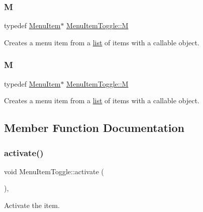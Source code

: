 \subsubsection{\texorpdfstring{M}{M}\hspace{0.1cm}{\footnotesize\ttfamily [1/2]}}
{\footnotesize\ttfamily typedef \hyperlink{classMenuItem}{Menu\+Item}$\ast$ \hyperlink{classMenuItemToggle_a4f44d80e256ed59e1994b4a04f009903}{Menu\+Item\+Toggle\+::M}}

Creates a menu item from a \hyperlink{protocollist-p}{list} of items with a callable object. \mbox{\label{classMenuItemToggle_a4f44d80e256ed59e1994b4a04f009903}} 
\subsubsection{\texorpdfstring{M}{M}\hspace{0.1cm}{\footnotesize\ttfamily [2/2]}}
{\footnotesize\ttfamily typedef \hyperlink{classMenuItem}{Menu\+Item}$\ast$ \hyperlink{classMenuItemToggle_a4f44d80e256ed59e1994b4a04f009903}{Menu\+Item\+Toggle\+::M}}

Creates a menu item from a \hyperlink{protocollist-p}{list} of items with a callable object. 

\subsection{Member Function Documentation}
\mbox{\label{classMenuItemToggle_a565753be8b77ee82cb1ec98f21924d49}} 
\subsubsection{\texorpdfstring{activate()}{activate()}\hspace{0.1cm}{\footnotesize\ttfamily [1/2]}}
{\footnotesize\ttfamily void Menu\+Item\+Toggle\+::activate (\begin{DoxyParamCaption}{ }\end{DoxyParamCaption})\hspace{0.3cm}{\ttfamily [override]}, {\ttfamily [virtual]}}

Activate the item. 

